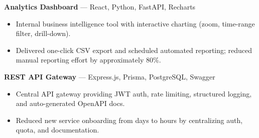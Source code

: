 \documentclass[11pt,a4paper]{article}
\newcommand{\cvheading}[1]{\textbf{#1}}
\begin{document}
\vspace{4pt}
\cvheading{Analytics Dashboard} --- React, Python, FastAPI, Recharts
\begin{itemize}[leftmargin=1.2em,itemsep=1pt,topsep=2pt]
  \item Internal business intelligence tool with interactive charting (zoom, time-range filter, drill-down).
  \item Delivered one-click CSV export and scheduled automated reporting; reduced manual reporting effort by approximately 80\%.
\end{itemize}

\vspace{4pt}
\cvheading{REST API Gateway} --- Express.js, Prisma, PostgreSQL, Swagger
\begin{itemize}[leftmargin=1.2em,itemsep=1pt,topsep=2pt]
  \item Central API gateway providing JWT auth, rate limiting, structured logging, and auto-generated OpenAPI docs.
  \item Reduced new service onboarding from days to hours by centralizing auth, quota, and documentation.
\end{itemize}
\end{document}
